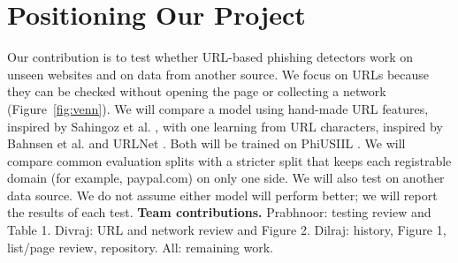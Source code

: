 \documentclass[sigconf,nonacm]{acmart}
\begin{document}
\section{Positioning Our Project}
Our contribution is to test whether URL-based phishing detectors work on unseen websites and on data from another source. We focus on URLs because they can be checked without opening the page or collecting a network (Figure~\ref{fig:venn}). We will compare a model using hand-made URL features, inspired by Sahingoz et al. \cite{sahingoz}, with one learning from URL characters, inspired by Bahnsen et al. and URLNet \cite{bahnsen,urlnet}. Both will be trained on PhiUSIIL \cite{phius}. We will compare common evaluation splits with a stricter split that keeps each registrable domain (for example, paypal.com) on only one side. We will also test on another data source. We do not assume either model will perform better; we will report the results of each test.
\noindent\textbf{Team contributions.} Prabhnoor: testing review and Table 1. Divraj: URL and network review and Figure 2. Dilraj: history, Figure 1, list/page review, repository. All: remaining work.


\end{document}
